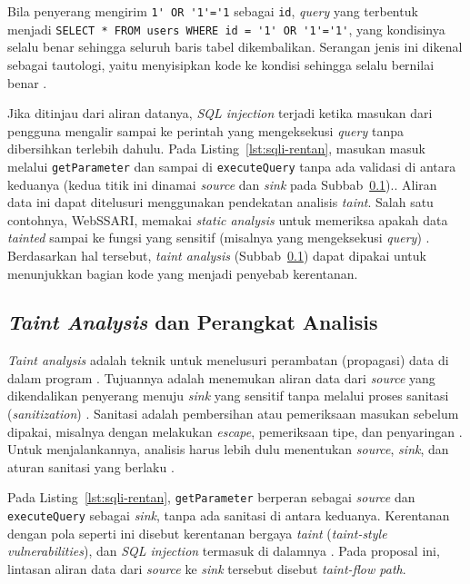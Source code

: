 Bila penyerang mengirim \lstinline|1' OR '1'='1| sebagai \lstinline|id|,
\textit{query} yang terbentuk menjadi \lstinline|SELECT * FROM users WHERE id = '1' OR '1'='1'|,
yang kondisinya selalu benar sehingga seluruh baris tabel dikembalikan.
Serangan jenis ini dikenal sebagai tautologi,
yaitu menyisipkan kode ke kondisi sehingga selalu bernilai benar \autocite{halfond2006}.

Jika ditinjau dari aliran datanya, \textit{SQL injection} terjadi ketika masukan dari pengguna
mengalir sampai ke perintah yang mengeksekusi \textit{query} tanpa dibersihkan terlebih dahulu.
Pada Listing~\ref{lst:sqli-rentan}, masukan masuk melalui \lstinline|getParameter|
dan sampai di \lstinline|executeQuery| tanpa ada validasi di antara keduanya 
(kedua titik ini dinamai \textit{source} dan \textit{sink} pada Subbab~\ref{sec:taint-perangkat}).. Aliran
data ini dapat ditelusuri menggunakan pendekatan analisis \textit{taint}.
Salah satu contohnya, WebSSARI, memakai \textit{static analysis} untuk memeriksa
apakah data \textit{tainted} sampai ke fungsi yang sensitif (misalnya yang mengeksekusi \textit{query})
\autocite{halfond2006}.
Berdasarkan hal tersebut, \textit{taint analysis} (Subbab~\ref{sec:taint-perangkat})
dapat dipakai untuk menunjukkan bagian kode yang menjadi penyebab kerentanan.

\subsection{\textit{Taint Analysis} dan Perangkat Analisis}
\label{sec:taint-perangkat}
\textit{Taint analysis} adalah teknik untuk menelusuri perambatan (propagasi) data di dalam program \autocite{yamaguchi2015}.
Tujuannya adalah menemukan aliran data dari \textit{source} yang dikendalikan penyerang
menuju \textit{sink} yang sensitif tanpa melalui proses sanitasi (\textit{sanitization}) \autocite{yamaguchi2015}.
Sanitasi adalah pembersihan atau pemeriksaan masukan sebelum dipakai,
misalnya dengan melakukan \textit{escape}, pemeriksaan tipe, dan penyaringan \autocite{halfond2006}.
Untuk menjalankannya, analisis harus lebih dulu menentukan \textit{source}, \textit{sink}, dan aturan sanitasi yang berlaku \autocite{yamaguchi2015}.

Pada Listing~\ref{lst:sqli-rentan}, \lstinline|getParameter| berperan sebagai \textit{source}
dan \lstinline|executeQuery| sebagai \textit{sink}, tanpa ada sanitasi di antara keduanya.
Kerentanan dengan pola seperti ini disebut kerentanan bergaya \textit{taint} (\textit{taint-style vulnerabilities}),
dan \textit{SQL injection} termasuk di dalamnya \autocite{yamaguchi2015}.
Pada proposal ini, lintasan aliran data dari \textit{source} ke \textit{sink} tersebut disebut \textit{taint-flow path}.

